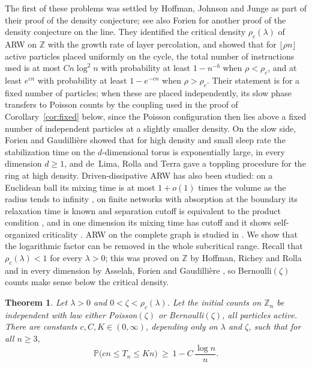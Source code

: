 \documentclass[11pt]{amsart}
\newtheorem{theorem}{Theorem}[section]
\theoremstyle{remark}
\newcommand{\Z}{\mathbb Z}
\renewcommand{\Pr}{\mathbb P}
\begin{document}
The first of these problems was settled by Hoffman, Johnson and Junge \cite{HJJ} as part of their proof of the density
conjecture; see also Forien \cite{Forien} for another proof of the density conjecture on the line. They identified the
critical density $\rho_c(\lambda)$ of ARW on $\Z$ with the growth rate of layer percolation, and showed
\cite[Proposition~8.12]{HJJ} that for $\lfloor\rho n\rfloor$ active particles placed uniformly on the cycle, the total
number of instructions used is at most $Cn\log^2 n$ with probability at least $1-n^{-b}$ when $\rho<\rho_c$, and at least
$e^{cn}$ with probability at least $1-e^{-cn}$ when $\rho>\rho_c$. Their statement is for a fixed number of particles;
when these are placed independently, its slow phase transfers to Poisson counts by the coupling used in the proof of
Corollary~\ref{cor:fixed} below, since the Poisson configuration then lies above a fixed number of independent particles
at a slightly smaller density. On the
slow side, Forien and Gaudilli\`ere \cite{FG} showed that for high density and small sleep rate the stabilization time on
the $d$-dimensional torus is exponentially large, in every dimension $d\ge1$, and de~Lima, Rolla and Terra \cite{LRT}
gave a toppling procedure for the ring at high density. Driven-dissipative ARW has also been studied: on a Euclidean ball its mixing time is at most
$1+o(1)$ times the volume as the radius tends to infinity \cite{LL}, on finite networks with
absorption at the boundary its relaxation time is known and separation cutoff is equivalent to the product condition
\cite{BS}, and in one dimension its mixing time has cutoff \cite{HJJMcut} and it shows self-organized criticality
\cite{HJJMsoc}. ARW on the complete graph is studied in \cite{JKM}. We show that the logarithmic factor can be removed in the
whole subcritical range. Recall that $\rho_c(\lambda)<1$ for every $\lambda>0$; this was proved on $\Z$ by Hoffman,
Richey and Rolla \cite{HRR} and in every dimension by Asselah, Forien and Gaudilli\`ere \cite{AFG}, so Bernoulli$(\zeta)$ counts
make sense below the critical density.

\begin{theorem}\label{thm:main}
Let $\lambda>0$ and $0<\zeta<\rho_c(\lambda)$. Let the initial counts on $\Z_n$ be independent with law either
Poisson$(\zeta)$ or Bernoulli$(\zeta)$, all particles active. There are constants $c,C,K\in(0,\infty)$, depending only
on $\lambda$ and $\zeta$, such that for all $n\ge 3$,
\begin{equation}\label{eq:main}
\Pr\bigl(cn\le T_n\le Kn\bigr)\ \ge\ 1-C\,\frac{\log n}{n}.
\end{equation}
\end{theorem}
\end{document}
